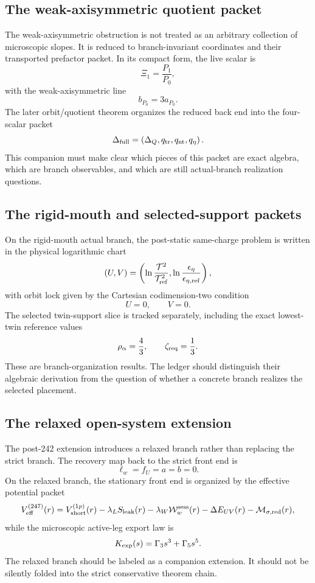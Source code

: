\subsection{The weak-axisymmetric quotient packet}

The weak-axisymmetric obstruction is not treated as an arbitrary collection of microscopic slopes.  It is reduced to branch-invariant coordinates and their transported prefactor packet.  In its compact form, the live scalar is
\[
\Xi_1=\frac{P_1}{P_0},
\]
with the weak-axisymmetric line
\[
b_{P_0}=3a_{P_0}.
\]
The later orbit/quotient theorem organizes the reduced back end into the four-scalar packet
\[
\Delta_{\rm full}
=\left(\Delta_Q,q_{\rm tr},q_{\rm nt},q_\eta\right).
\]
This companion must make clear which pieces of this packet are exact algebra, which are branch observables, and which are still actual-branch realization questions.

\subsection{The rigid-mouth and selected-support packets}

On the rigid-mouth actual branch, the post-static same-charge problem is written in the physical logarithmic chart
\[
(U,V)=
\left(
\ln\frac{\mathcal T^2}{\mathcal T_{\rm ref}^2},
\ln\frac{\epsilon_\eta}{\epsilon_{\eta,{\rm ref}}}
\right),
\]
with orbit lock given by the Cartesian codimension-two condition
\[
U=0,
\qquad
V=0.
\]
The selected twin-support slice is tracked separately, including the exact lowest-twin reference values
\[
\rho_\alpha=\frac43,
\qquad
\zeta_{\rm req}=\frac13.
\]
These are branch-organization results.  The ledger should distinguish their algebraic derivation from the question of whether a concrete branch realizes the selected placement.

\subsection{The relaxed open-system extension}

The post-242 extension introduces a relaxed branch rather than replacing the strict branch.  The recovery map back to the strict front end is
\[
\ell_w=f_U=a=b=0.
\]
On the relaxed branch, the stationary front end is organized by the effective potential packet
\[
V_{\rm eff}^{(247)}(r)
=
V_{\rm short}^{(1p)}(r)
-
\lambda_L S_{\rm leak}(r)
-
\lambda_W\mathcal W_w^{\rm sess}(r)
-
\Delta E_{UV}(r)
-
\mathcal M_{\sigma,{\rm red}}(r),
\]
while the microscopic active-leg export law is
\[
K_{\rm exp}(s)=\Gamma_3s^3+\Gamma_5s^5.
\]
The relaxed branch should be labeled as a companion extension.  It should not be silently folded into the strict conservative theorem chain.

